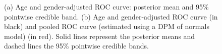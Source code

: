 \begin{figure}[ht!]
\begin{center}
\end{center}
\caption{(a) Age and gender-adjusted ROC curve: posterior mean and 95\% pointwise credible band. (b) Age and gender-adjusted ROC curve (in black) and pooled ROC curve (estimated using a DPM of normals model) (in red). Solid lines represent the posterior means and dashed lines the  95\% pointwise credible bands.}
\label{AROC_bnp_complete}
\end{figure}

